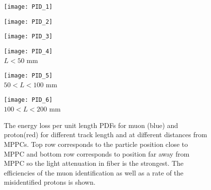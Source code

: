 \documentclass[main.tex]{subfiles}
\begin{document}
\begin{figure}[!ht]
	\centering
	\begin{minipage}{0.25\linewidth}
		\centering
		\texttt{[image: PID\_1]}
	\end{minipage}
	\begin{minipage}{0.25\linewidth}
		\centering
		\texttt{[image: PID\_2]}
	\end{minipage}
	\begin{minipage}{0.25\linewidth}
		\centering
		\texttt{[image: PID\_3]}
	\end{minipage}
	\hfill
	\begin{minipage}{0.25\linewidth}
		\centering
		\texttt{[image: PID\_4]} \\ $ L < 50$ mm
	\end{minipage}
	\begin{minipage}{0.25\linewidth}
		\centering
		\texttt{[image: PID\_5]} \\ $50 < L < 100$ mm
	\end{minipage}
	\begin{minipage}{0.25\linewidth}
		\centering
		\texttt{[image: PID\_6]} \\  $100 < L < 200$ mm
	\end{minipage}
	\caption{The energy loss per unit length PDFs for muon (blue) and proton(red) for different track length and at different distances from MPPCs. Top row corresponds to the particle position close to MPPC and bottom row corresponds to position far away from MPPC so the light attenuation in fiber is the strongest. The efficiencies of the muon identification as well as a rate of the misidentified protons is shown.}
	\label{fig:up:sfgd:pid}
\end{figure}
\end{document}
